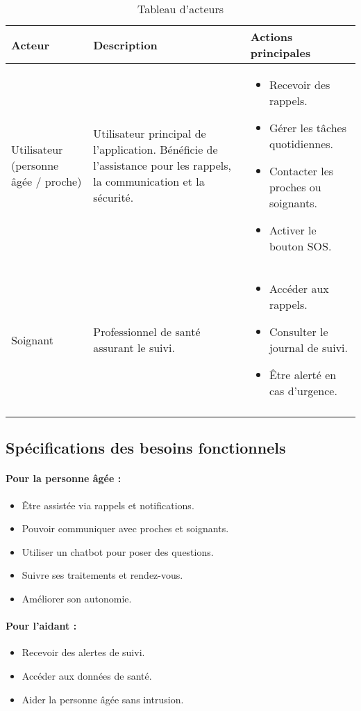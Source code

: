 \documentclass[12pt,a4paper]{report}
\begin{document}
\begin{longtable}{|p{4cm}|p{5cm}|p{6cm}|}
\hline
\textbf{Acteur} & \textbf{Description} & \textbf{Actions principales} \\
\hline
Utilisateur (personne âgée / proche) & Utilisateur principal de l’application. Bénéficie de l’assistance pour les rappels, la communication et la sécurité. & 
\begin{itemize}
    \item Recevoir des rappels.
    \item Gérer les tâches quotidiennes.
    \item Contacter les proches ou soignants.
    \item Activer le bouton SOS.
\end{itemize} \\
\hline
Soignant & Professionnel de santé assurant le suivi. & 
\begin{itemize}
    \item Accéder aux rappels.
    \item Consulter le journal de suivi.
    \item Être alerté en cas d’urgence.
\end{itemize} \\
\hline
\caption{Tableau d'acteurs }
    \label{tab:tabActeur}
\end{longtable}

\subsection{Spécifications des besoins fonctionnels}

\paragraph{Pour la personne âgée :}
\begin{itemize}
    \item Être assistée via rappels et notifications.
    \item Pouvoir communiquer avec proches et soignants.
    \item Utiliser un chatbot pour poser des questions.
    \item Suivre ses traitements et rendez-vous.
    \item Améliorer son autonomie.
\end{itemize}

\paragraph{Pour l’aidant :}
\begin{itemize}
    \item Recevoir des alertes de suivi.
    \item Accéder aux données de santé.
    \item Aider la personne âgée sans intrusion.
\end{itemize}
\end{document}
